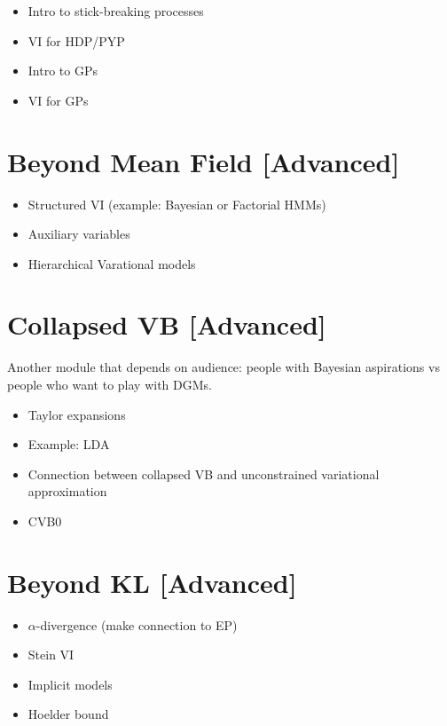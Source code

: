 \documentclass[11pt, a4paper]{article}
\begin{document}
\begin{itemize}
\item Intro to stick-breaking processes \citep{IshwaranJames:2001}
\item VI for HDP/PYP \citep{WangEtAl:2011}
\item Intro to GPs
\item VI for GPs
\end{itemize}

\section{Beyond Mean Field [Advanced]}
\begin{itemize}
\item Structured VI (example: Bayesian or Factorial HMMs)
\item Auxiliary variables
\item Hierarchical Varational models 
\end{itemize}

\section{Collapsed VB [Advanced]}

Another module that depends on audience: people with Bayesian aspirations vs people who want to play with DGMs.

\begin{itemize}
\item Taylor expansions
\item Example: LDA
\item Connection between collapsed VB and unconstrained variational approximation \citep{TehEtAl:2007}
\item CVB0 \citep{AsuncionEtAl:2009}
\end{itemize}

\section{Beyond KL [Advanced]}
\begin{itemize}
\item $ \alpha $-divergence (make connection to EP)
\item Stein VI
\item Implicit models
\item Hoelder bound
\end{itemize}




\end{document}
